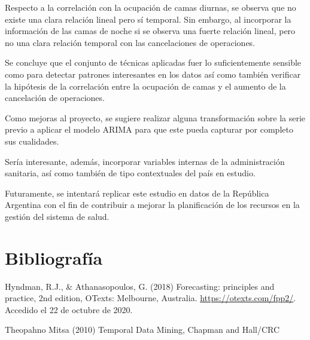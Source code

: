 \documentclass[
]{article}
\begin{document}
Respecto a la correlación con la ocupación de camas diurnas, se observa
que no existe una clara relación lineal pero sí temporal. Sin embargo,
al incorporar la información de las camas de noche si se observa una
fuerte relación lineal, pero no una clara relación temporal con las
cancelaciones de operaciones.

Se concluye que el conjunto de técnicas aplicadas fuer lo
suficientemente sensible como para detectar patrones interesantes en los
datos así como también verificar la hipótesis de la correlación entre la
ocupación de camas y el aumento de la cancelación de operaciones.

Como mejoras al proyecto, se sugiere realizar alguna transformación
sobre la serie previo a aplicar el modelo ARIMA para que este pueda
capturar por completo sus cualidades.

Sería interesante, además, incorporar variables internas de la
administración sanitaria, así como también de tipo contextuales del país
en estudio.

Futuramente, se intentará replicar este estudio en datos de la República
Argentina con el fin de contribuir a mejorar la planificación de los
recursos en la gestión del sistema de salud.

\hypertarget{bibliografuxeda}{%
\section{Bibliografía}\label{bibliografuxeda}}

Hyndman, R.J., \& Athanasopoulos, G. (2018) Forecasting: principles and
practice, 2nd edition, OTexts: Melbourne, Australia.
\href{OTexts.com/fpp2}{https://otexts.com/fpp2/}. Accedido el 22 de
octubre de 2020.

Theopahno Mitsa (2010) Temporal Data Mining, Chapman and Hall/CRC
\end{document}
